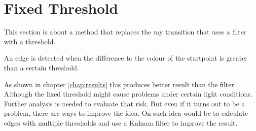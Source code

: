 \section{Fixed Threshold}
\label{sec:fixedThreshold}
This section is about a method that replaces the ray transition that uses a filter with a threshold. 

An edge is detected when the difference to the colour of the startpoint is greater than a certain threshold. 

As shown in chapter \ref{chap:results} this produces better result than the filter. Although the fixed threshold might cause problems under certain light conditions. Further analysis is needed to evaluate that risk. But even if it turns out to be a problem, there are ways to improve the idea. On such idea would be to calculate edges with multiple thresholds and use a Kalman filter to improve the result.




